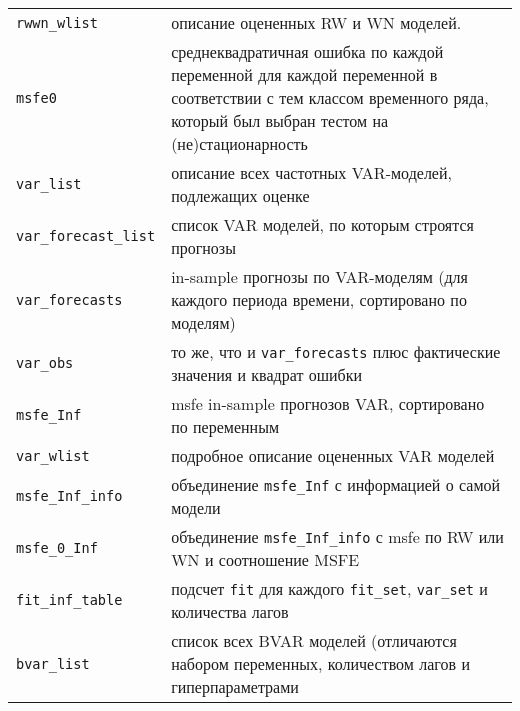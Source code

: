 \documentclass[11pt]{article} %
\begin{document}
\begin{center}
\begin{table}[h!]
\begin{tabular}{lp{12cm}}
 \verb|rwwn_wlist| & описание оцененных RW и WN моделей. \\
 \verb|msfe0| & среднеквадратичная ошибка по каждой переменной для каждой переменной в соответствии с тем классом временного ряда, который был выбран тестом на (не)стационарность\\
\midrule
 \verb|var_list| & описание всех частотных VAR-моделей, подлежащих оценке\\
 \verb|var_forecast_list| & список VAR моделей, по которым строятся прогнозы\\
 \verb|var_forecasts| & in-sample прогнозы по VAR-моделям (для каждого периода времени, сортировано по моделям)\\
 \verb|var_obs| & то же, что и \verb|var_forecasts| плюс фактические значения и квадрат ошибки\\
 \verb|msfe_Inf| & msfe in-sample прогнозов VAR, сортировано по переменным\\
\midrule
 \verb|var_wlist| & подробное описание оцененных VAR моделей\\
 \verb|msfe_Inf_info| & объединение \verb|msfe_Inf| с информацией о самой модели \\
 \verb|msfe_0_Inf| & объединение \verb|msfe_Inf_info| с msfe по RW или WN и соотношение MSFE\\
 \verb|fit_inf_table| & подсчет \verb|fit| для каждого \verb|fit_set|, \verb|var_set| и количества лагов \\
 \verb|bvar_list| & список всех BVAR моделей (отличаются набором переменных, количеством лагов и гиперпараметрами\\
\bottomrule
\end{tabular}
\end{table}
\end{center}
\end{document}
